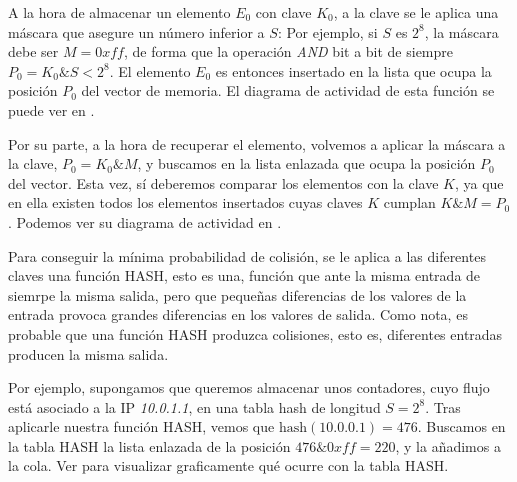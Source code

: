 A la hora de almacenar un elemento $E_0$ con clave $K_0$, a la clave se le aplica una máscara que asegure un número 
inferior a $S$: Por ejemplo, si $S$ es $2^8$, la máscara debe ser $M=0xff$, de forma que la operación \emph{AND} bit a 
bit de siempre $P_0=K_0\&S<2^8$. El elemento $E_0$ es entonces insertado en la lista que ocupa la posición $P_0$ del 
vector de memoria. El diagrama de actividad de esta función se puede ver en .

Por su parte, a la hora de recuperar el elemento, volvemos a aplicar la máscara a la clave, $P_0=K_0\&M$, y buscamos en 
la lista enlazada que ocupa la posición $P_0$ del vector. Esta vez, sí deberemos comparar los elementos con la clave 
$K$, ya que en ella existen todos los elementos insertados cuyas claves $K$ cumplan $K\&M=P_0$. Podemos ver su diagrama 
de actividad en .

Para conseguir la mínima probabilidad de colisión, se le aplica a las diferentes claves una función HASH, esto es una, función que ante la misma entrada de siemrpe la misma salida, pero que pequeñas diferencias de los 
valores de la entrada provoca grandes diferencias en los valores de salida. Como nota, es probable que una función HASH 
produzca colisiones, esto es, diferentes entradas producen la misma salida.

Por ejemplo, supongamos que queremos almacenar unos contadores, cuyo flujo está asociado a la \gls{IP} \emph{10.0.1.1}, 
en una tabla hash de longitud $S=2^8$. Tras aplicarle nuestra función HASH, vemos que 
$\text{hash}(\text{10.0.0.1})=476$. Buscamos en la tabla HASH la lista enlazada de la posición 
$476\&0xff=220$, y la añadimos a la cola. Ver  para visualizar graficamente qué ocurre 
con la tabla HASH.


